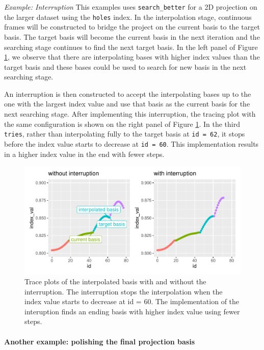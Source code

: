 \documentclass[12pt]{article}
\begin{document}
\emph{Example: Interruption} This examples uses \texttt{search\_better}
for a 2D projection on the larger dataset using the \texttt{holes}
index. In the interpolation stage, continuous frames will be constructed
to bridge the project on the current basis to the target basis. The
target basis will become the current basis in the next iteration and the
searching stage continues to find the next target basis. In the left
panel of Figure \ref{interruption}, we observe that there are
interpolating bases with higher index values than the target basis and
these bases could be used to search for new basis in the next searching
stage.

An interruption is then constructed to accept the interpolating bases up
to the one with the largest index value and use that basis as the
current basis for the next searching stage. After implementing this
interruption, the tracing plot with the same configuration is shown on
the right panel of Figure \ref{interruption}. In the third
\texttt{tries}, rather than interpolating fully to the target basis at
\texttt{id\ =\ 62}, it stops before the index value starts to decrease
at \texttt{id\ =\ 60}. This implementation results in a higher index
value in the end with fewer steps.

\begin{figure}
\centering
\includegraphics{paper_files/figure-latex/interruption-1.pdf}
\caption{\label{interruption}Trace plots of the interpolated basis with
and without the interruption. The interruption stops the interpolation
when the index value starts to decrease at id = 60. The implementation
of the interuption finds an ending basis with higher index value using
fewer steps.}
\end{figure}

\hypertarget{another-example-polishing-the-final-projection-basis}{%
\paragraph{Another example: polishing the final projection
basis}\label{another-example-polishing-the-final-projection-basis}}
\end{document}
